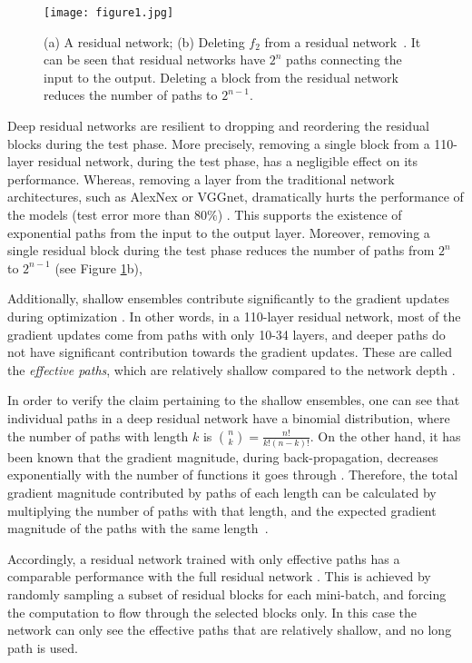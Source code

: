 \documentclass[journal]{IEEEtran}
\begin{document}
\begin{figure}[!htb]
\centering
\texttt{[image: figure1.jpg]}
\caption{(a) A residual network; (b) Deleting $f_2$ from a residual network~\protect\cite{veit2016residual}. It can be seen that residual networks have $2^n$ paths connecting the input to the output. Deleting a block from the residual network reduces the number of paths to $2^{n-1}$.}
\label{fig:unreview}
\end{figure}

Deep residual networks are resilient to dropping and reordering the residual blocks during the test phase. More precisely, removing a single block from a 110-layer residual network, during the test phase, has a negligible effect on its performance. Whereas, removing a layer from the traditional network architectures, such as AlexNex\cite{krizhevsky2012imagenet} or VGGnet\cite{simonyan2014very}, dramatically hurts the performance of the models (test error more than $80\%$) \cite{veit2016residual}. This supports the existence of exponential paths from the input to the output layer. Moreover, removing a single residual block during the test phase reduces the number of paths from $2^n$ to $2^{n-1}$ (see Figure \ref{fig:unreview}b), 


Additionally, shallow ensembles contribute significantly to the gradient updates during optimization . In other words, in a 110-layer residual network, most of the gradient updates come from paths with only 10-34 layers, and deeper paths do not have significant contribution towards  the gradient updates. These are called the \textit{effective paths}, which are relatively shallow compared to the network depth \cite{veit2016residual}.


In order to verify the claim pertaining to the shallow ensembles, one can see that individual paths in a deep residual network have a binomial distribution, where the number of paths with length $k$ is $\binom{n}{k} = \frac{n!}{k!(n-k)!}$. On the other hand, it has been known that the gradient magnitude, during back-propagation,  decreases exponentially with the number of functions it goes through \cite{hochreiter1991untersuchungen,bengio1994learning}. Therefore, the total gradient magnitude contributed by paths of each length can be calculated by multiplying the number of paths with that length, and the expected gradient magnitude of the paths with the same length~\cite{veit2016residual}.

Accordingly, a residual network trained  with only effective paths has a comparable performance with the full residual network \cite{veit2016residual}. This is achieved by randomly sampling a subset of residual blocks for each mini-batch, and forcing the computation to flow through the selected blocks only. In this case the network can only see the effective paths that are relatively shallow, and no long path is used.
\end{document}
